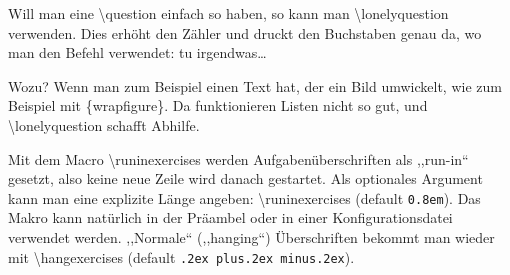 \documentclass[hyperworksheet]{drcschool}
\newcommand*{\cs}[1]{\textup{\ttfamily\textbackslash#1}}                   %
\newcommand*{\oarg}[1]{\textup{\ttfamily[#1]}}                             %
\newcommand*{\env}[1]{\textup{\ttfamily\{#1\}}}                            %
\newcommand*{\param}[1]{\mbox{\normalfont$\langle$\textit{#1}$\rangle$}}   %
\begin{document}
\begin{worksheet}
Will man eine \cs{question} einfach so haben, so kann man \cs{lonelyquestion}
verwenden. Dies erhöht den Zähler und druckt den Buchstaben genau da, wo
man den Befehl verwendet: \lonelyquestion tu irgendwas\ldots

\begin{solution}
\answer Wozu? Wenn man zum Beispiel einen Text hat, der ein Bild umwickelt,
wie zum Beispiel mit \env{wrapfigure}. Da funktionieren Listen nicht so gut,
und \cs{lonelyquestion} schafft Abhilfe.
\end{solution}

\runinexercises
{} Mit dem Macro \cs{runinexercises} werden Aufgabenüberschriften
als ,,run-in`` gesetzt, also keine neue Zeile wird danach gestartet. Als optionales
Argument kann man eine explizite Länge angeben: \cs{runinexercises}\oarg{\param{Länge}}
(default \texttt{0.8em}). Das Makro kann natürlich in der Präambel oder in einer
Konfigurationsdatei verwendet werden. ,,Normale`` (,,hanging``) Überschriften
bekommt man wieder mit \cs{hangexercises}\oarg{\param{Länge}} (default \texttt{.2ex plus.2ex minus.2ex}).

\end{worksheet}

\end{document}
